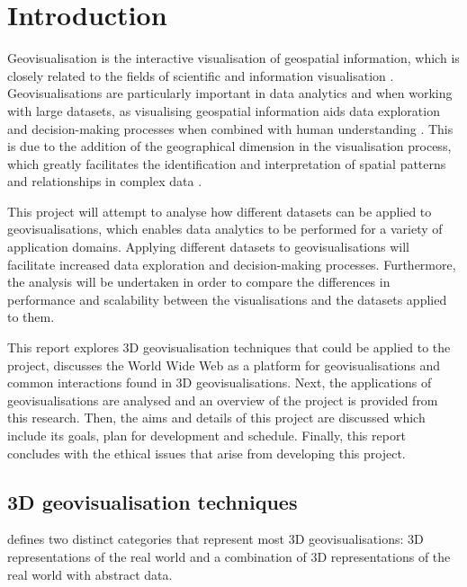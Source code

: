 \documentclass[
	fontsize=11pt
	headlines=2,
	footlines=2,
	parskip=half
]{scrartcl}
\begin{document}
	\section{Introduction} {
	\label{sec:introduction}

		Geovisualisation is the interactive visualisation of geospatial information, which is closely related to the fields of scientific and information visualisation \parencite{jiang2005geovisualization}. Geovisualisations are particularly important in data analytics and when working with large datasets, as visualising geospatial information aids data exploration and decision-making processes when combined with human understanding \parencite{grinstein2002introduction, hendley1995case}. This is due to the addition of the geographical dimension in the visualisation process, which greatly facilitates the identification and interpretation of spatial patterns and relationships in complex data \parencite{kwan2004geovisualization}.

		This project will attempt to analyse how different datasets can be applied to geovisualisations, which enables data analytics to be performed for a variety of application domains. Applying different datasets to geovisualisations will facilitate increased data exploration and decision-making processes. Furthermore, the analysis will be undertaken in order to compare the differences in performance and scalability between the visualisations and the datasets applied to them.
		
		This report explores 3D geovisualisation techniques that could be applied to the project, discusses the World Wide Web as a platform for geovisualisations and common interactions found in 3D geovisualisations. Next, the applications of geovisualisations are analysed and an overview of the project is provided from this research. Then, the aims and details of this project are discussed which include its goals, plan for development and schedule. Finally, this report concludes with the ethical issues that arise from developing this project.

		\subsection{3D geovisualisation techniques} {

			\textcite{bleisch2012geovisualization} defines two distinct categories that represent most 3D geovisualisations: 3D representations of the real world and a combination of 3D representations of the real world with abstract data.

}}
\end{document}
